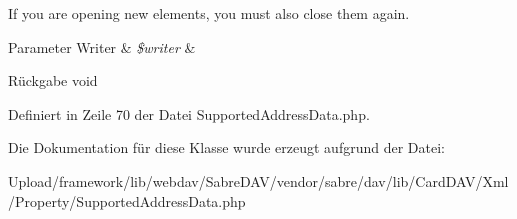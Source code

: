 If you are opening new elements, you must also close them again.


\begin{DoxyParams}[1]{Parameter}
Writer & {\em \$writer} & \\
\hline
\end{DoxyParams}
\begin{DoxyReturn}{Rückgabe}
void 
\end{DoxyReturn}


Definiert in Zeile 70 der Datei Supported\+Address\+Data.\+php.



Die Dokumentation für diese Klasse wurde erzeugt aufgrund der Datei\+:\begin{DoxyCompactItemize}
\item 
Upload/framework/lib/webdav/\+Sabre\+D\+A\+V/vendor/sabre/dav/lib/\+Card\+D\+A\+V/\+Xml/\+Property/Supported\+Address\+Data.\+php\end{DoxyCompactItemize}
